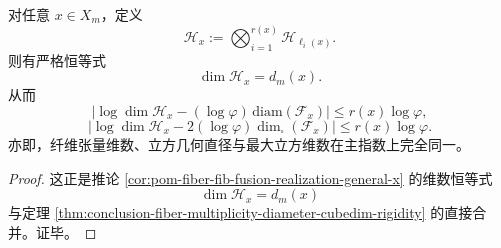 \begin{corollary}[纤维融合维数与立方几何熵的同一律]\label{cor:conclusion-fiber-fusion-dimension-geometry-same-law}
对任意 \(x\in X_m\)，定义
\[
\mathcal H_x:=\bigotimes_{i=1}^{r(x)}\mathcal H_{\ell_i(x)}.
\]
则有严格恒等式
\[
\dim \mathcal H_x=d_m(x).
\]
从而
\[
\bigl|
\log\dim \mathcal H_x-(\log\varphi)\,\mathrm{diam}(\mathcal F_x)
\bigr|
\le r(x)\log\varphi,
\]
\[
\bigl|
\log\dim \mathcal H_x-2(\log\varphi)\dim_\square(\mathcal F_x)
\bigr|
\le r(x)\log\varphi.
\]
亦即，纤维张量维数、立方几何直径与最大立方维数在主指数上完全同一。
\end{corollary}
\begin{proof}
这正是推论 \ref{cor:pom-fiber-fib-fusion-realization-general-x} 的维数恒等式
\[
\dim \mathcal H_x=d_m(x)
\]
与定理 \ref{thm:conclusion-fiber-multiplicity-diameter-cubedim-rigidity} 的直接合并。证毕。
\end{proof}

